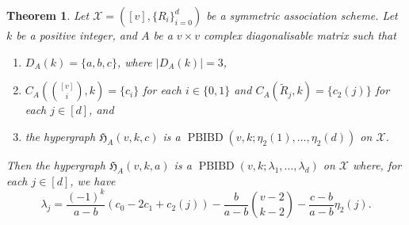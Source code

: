 \documentclass[11pt]{article}
\newtheorem{theorem}{Theorem}[section]
\begin{document}
\begin{theorem}\label{thm:pbibd2}
Let $\mathcal{X}=([v],\{R_i\}_{i=0}^d)$ be a symmetric association scheme. 
Let $k$ be a positive integer, and $A$ be a $v\times v$ complex diagonalisable matrix such that  
\begin{enumerate}
    \item $D_A(k)=\{a,b,c\}$, where $|D_A(k)| = 3$,
    \item $C_A \left (\binom{[v]}{i},k \right) = \{c_i\}$ for each $i \in \{0,1\}$ and $C_A(\tilde{R}_j,k) = \{c_2(j)\}$ for each $j \in [d]$, and 
    \item %
    the hypergraph $\mathfrak H_{A}(v,k,c)$  is a $\operatorname{PBIBD}(v,k;\eta_2(1),\dots,\eta_2(d))$ on $\mathcal{X}$.
\end{enumerate}
Then the hypergraph $\mathfrak H_{A}(v,k,a)$ 
is a $\operatorname{PBIBD}(v,k;\lambda_1,\dots,\lambda_d)$ on $\mathcal{X}$ where, for each $j \in [d]$, we have
\[
\lambda_j=\frac{(-1)^k}{a-b}\left(c_0-2c_1+c_{2}(j)\right)-\frac{b}{a-b}\binom{v-2}{k-2}-\frac{c-b}{a-b}\eta_2(j).
\]
\end{theorem}
\end{document}
